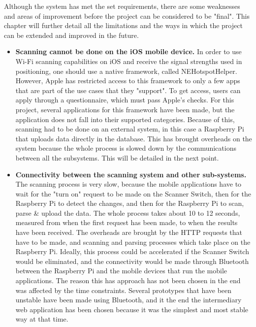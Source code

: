 Although the system has met the set requirements, there are some weaknesses and areas of improvement before the project can be considered to be "final". This chapter will further detail all the limitations and the ways in which the project can be extended and improved in the future.
\begin{itemize}
    \item \textbf{Scanning cannot be done on the iOS mobile device.}\newline
    In order to use Wi-Fi scanning capabilities on iOS and receive the signal strengths used in positioning, one should use a native framework, called NEHotspotHelper. However, Apple has restricted access to this framework to only a few apps that are part of the use cases that they "support". To get access, users can apply through a questionnaire, which must pass Apple's checks. For this project, several applications for this framework have been made, but the application does not fall into their supported categories. Because of this, scanning had to be done on an external system, in this case a Raspberry Pi that uploads data directly in the database. This has brought overheads on the system because the whole process is slowed down by the communications between all the subsystems. This will be detailed in the next point.
    
    \item \textbf{Connectivity between the scanning system and other sub-systems.}\newline
    The scanning process is very slow, because the mobile applications have to wait for the "turn on" request to be made on the Scanner Switch, then for the Raspberry Pi to detect the changes, and then for the Raspberry Pi to scan, parse \& upload the data. The whole process takes about 10 to 12 seconds, measured from when the first request has been made, to when the results have been received. The overheads are brought by the HTTP requests that have to be made, and scanning and parsing processes which take place on the Raspberry Pi. Ideally, this process could be accelerated if the Scanner Switch would be eliminated, and the connectivity would be made through Bluetooth between the Raspberry Pi and the mobile devices that run the mobile applications. The reason this has approach has not been chosen in the end was affected by the time constraints. Several prototypes that have been unstable have been made using Bluetooth, and it the end the intermediary web application has been chosen because it was the simplest and most stable way at that time.
    

\end{itemize}
